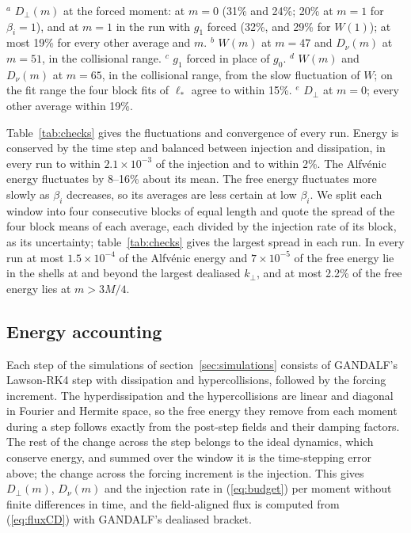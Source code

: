 \begin{table}[t]
  \smallskip
  {\footnotesize $^a$ $D_\perp(m)$ at the forced moment: at $m=0$ (31\% and 24\%; 20\% at $m=1$ for $\beta_i=1$), and at $m=1$ in the run with $g_1$ forced (32\%, and 29\% for $W(1)$); at most 19\% for every other average and $m$. $^b$ $W(m)$ at $m=47$ and $D_\nu(m)$ at $m=51$, in the collisional range. $^c$ $g_1$ forced in place of $g_0$. $^d$ $W(m)$ and $D_\nu(m)$ at $m=65$, in the collisional range, from the slow fluctuation of $W$; on the fit range the four block fits of $\ell_*$ agree to within 15\%. $^e$ $D_\perp$ at $m=0$; every other average within 19\%.}
\end{table}

Table~\ref{tab:checks} gives the fluctuations and convergence of every run. Energy is conserved by the time step and balanced between injection and dissipation, in every run to within $2.1\times10^{-3}$ of the injection and to within 2\%. The Alfv\'enic energy fluctuates by 8--16\% about its mean. The free energy fluctuates more slowly as $\beta_i$ decreases, so its averages are less certain at low $\beta_i$. We split each window into four consecutive blocks of equal length and quote the spread of the four block means of each average, each divided by the injection rate of its block, as its uncertainty; table~\ref{tab:checks} gives the largest spread in each run. In every run at most $1.5\times10^{-4}$ of the Alfv\'enic energy and $7\times10^{-5}$ of the free energy lie in the shells at and beyond the largest dealiased $k_\perp$, and at most 2.2\% of the free energy lies at $m>3M/4$.

\subsection{Energy accounting}

Each step of the simulations of section~\ref{sec:simulations} consists of GANDALF's Lawson-RK4 step with dissipation and hypercollisions, followed by the forcing increment. The hyperdissipation and the hypercollisions are linear and diagonal in Fourier and Hermite space, so the free energy they remove from each moment during a step follows exactly from the post-step fields and their damping factors. The rest of the change across the step belongs to the ideal dynamics, which conserve energy, and summed over the window it is the time-stepping error above; the change across the forcing increment is the injection. This gives $D_\perp(m)$, $D_\nu(m)$ and the injection rate in (\ref{eq:budget}) per moment without finite differences in time, and the field-aligned flux is computed from (\ref{eq:fluxCD}) with GANDALF's dealiased bracket.

